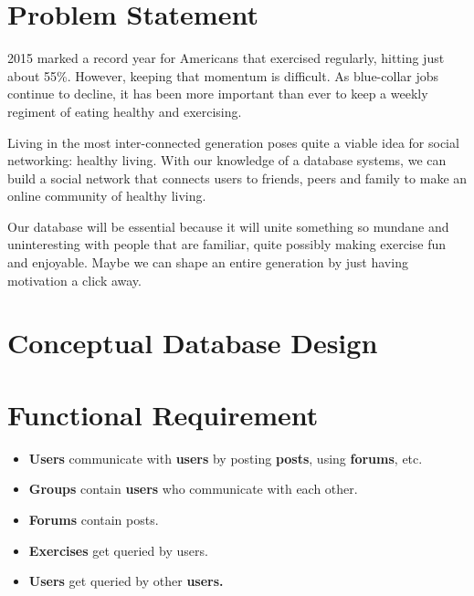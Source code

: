 \documentclass{article}
\begin{document}
\section{Problem Statement}
2015 marked a record year for Americans that exercised regularly, hitting just about 55\%. However, keeping that momentum is difficult. As blue-collar jobs continue to decline, it has been more important than ever to keep a weekly regiment of eating healthy and exercising.

Living in the most inter-connected generation poses quite a viable idea for social networking: healthy living. With our knowledge of a database systems, we can build a social network that connects users to friends, peers and family to make an online community of healthy living.

Our database will be essential because it will unite something so mundane and uninteresting with people that are familiar, quite possibly making exercise fun and enjoyable. Maybe we can shape an entire generation by just having motivation a click away.

\section{Conceptual Database Design}


\section{Functional Requirement}
\begin{itemize}
    \item \textbf{Users} communicate with \textbf{users} by posting \textbf{posts}, using \textbf{forums}, etc.
    \item \textbf{Groups} contain \textbf{users} who communicate with each other.
    \item \textbf{Forums} contain posts.
    \item \textbf{Exercises} get queried by users.
    \item \textbf{Users} get queried by other \textbf{users.}
\end{itemize}
\end{document}
